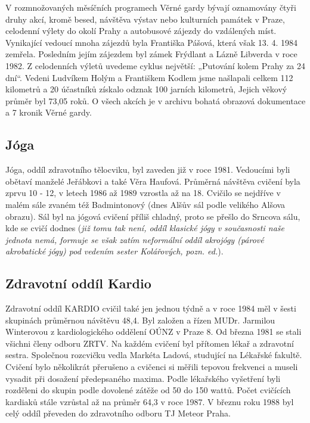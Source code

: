 V rozmnožovaných měsíčních programech Věrné gardy bývají oznamovány
čtyři druhy akcí, kromě besed, návštěva výstav nebo kulturních památek v
Praze, celodenní výlety do okolí Prahy a autobusové zájezdy do
vzdálených míst. Vynikající vedoucí mnoha zájezdů byla Františka Pášová,
která však 13. 4. 1984 zemřela. Posledním jejím zájezdem byl zámek
Frýdlant a Lázně Libverda v roce 1982. Z celodenních výletů uvedeme
cyklus největší: „Putování kolem Prahy za 24 dní``. Vedeni Ludvíkem
Holým a Františkem Kodlem jsme našlapali celkem 112 kilometrů a 20
účastníků získalo odznak 100 jarních kilometrů, Jejich věkový průměr byl
73,05 roků. O všech akcích je v archivu bohatá obrazová dokumentace a 7
kronik Věrné gardy.

\subsection{Jóga}\label{juxf3ga}

Jóga, oddíl zdravotního tělocviku, byl zaveden již v roce 1981.
Vedoucími byli obětaví manželé Jeřábkovi a také Věra Haufová. Průměrná
návštěva cvičení byla zprvu 10 - 12, v letech 1986 až 1989 vzrostla až
na 18. Cvičilo se nejdříve v malém sále zvaném též Badmintonový (dnes
Alšův sál podle velikého Alšova obrazu). Sál byl na jógová cvičení
příliš chladný, proto se přešlo do Srncova sálu, kde se cvičí dodnes
(\emph{již tomu tak není, oddíl klasické jógy v současnosti naše jednota
nemá, formuje se však zatím neformální oddíl akrojógy (párové
akrobatické jógy) pod vedením sester Kolářových, pozn. ed.}).

\subsection{Zdravotní oddíl Kardio}\label{zdravotnuxed-odduxedl-kardio}

Zdravotní oddíl KARDIO cvičil také jen jednou týdně a v roce 1984 měl v
šesti skupinách průměrnou návštěvu 48,4. Byl založen a řízen MUDr.
Jarmilou Winterovou z kardiologického oddělení OÚNZ v Praze 8. Od března
1981 se stali všichni členy odboru ZRTV. Na každém cvičení byl přítomen
lékař a zdravotní sestra. Společnou rozcvičku vedla Markéta Ladová,
studující na Lékařské fakultě. Cvičení bylo několikrát přerušeno a
cvičenci si měřili tepovou frekvenci a museli vysadit při dosažení
předepsaného maxima. Podle lékařského vyšetření byli rozděleni do skupin
podle dovolené zátěže od 50 do 150 wattů. Počet cvičících kardiaků stále
vzrůstal až na průměr 64,3 v roce 1987. V březnu roku 1988 byl celý
oddíl převeden do zdravotního odboru TJ Meteor Praha.

